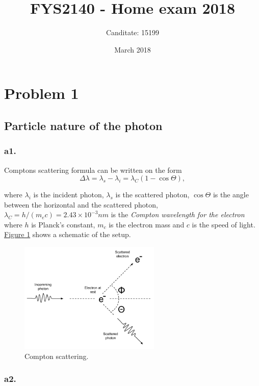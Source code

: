 \documentclass{article}
\title{FYS2140 - Home exam 2018}
\author{Canditate: 15199}
\date{March 2018}
\begin{document}
\maketitle

\section*{Problem 1}

\subsection*{Particle nature of the photon}

\subsubsection*{a1.}


Comptons scattering formula can be written on the form
\begin{equation}
\Delta \lambda = \lambda_{s} - \lambda_{i} = \lambda_C(1 - \cos{\Theta}), \label{eq_compton}
\end{equation}

where $\lambda_{i}$ is the incident photon, $\lambda_{s}$ is the scattered photon, $\cos{\Theta}$ is the angle between the horizontal and the scattered photon, $\lambda_C = h/(m_ec) = 2.43\times 10^{-3}nm$ is the \textit{Compton wavelength for the electron} where $h$ is Planck's constant, $m_c$ is the electron mass and $c$ is the speed of light. \hyperlink{figure_1}{Figure 1} shows a schematic of the setup.

\begin{figure}[t]
\centering
\includegraphics[width=0.6\textwidth]{comptonscattering}
\caption{Compton scattering.}
\label{fig:figure_label}
\end{figure}
\hypertarget{figure_1}{}

\subsubsection*{a2.}
\end{document}

